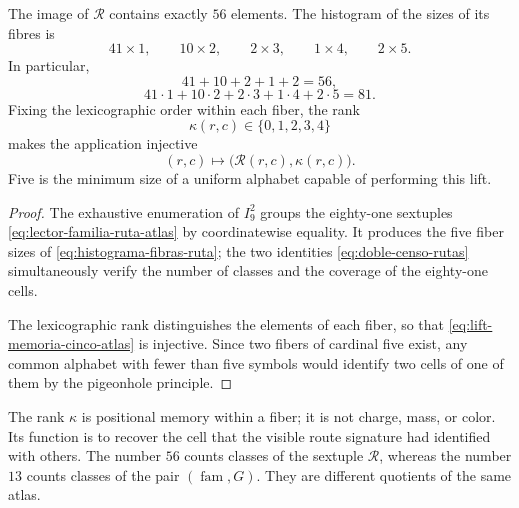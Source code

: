 \begin{theorem}
\label{thm:censo-56-familias-ruta-rev6}
The image of \(\mathcal R\) contains exactly \(56\) elements.  The
histogram of the sizes of its fibres is
\[
 41\times1,\qquad
 10\times2,\qquad
 2\times3,\qquad
 1\times4,\qquad
 2\times5.
 \tag{A7}\label{eq:histograma-fibras-ruta}
\]
In particular,
\[
 41+10+2+1+2=56,
\]
\[
 41\cdot1+10\cdot2+2\cdot3+1\cdot4+2\cdot5=81.
 \tag{A8}\label{eq:doble-censo-rutas}
\]
Fixing the lexicographic order within each fiber, the rank
\[
 \kappa(r,c)\in\{0,1,2,3,4\}
\]
makes the application injective
\[
 (r,c)\longmapsto\bigl(\mathcal R(r,c),\kappa(r,c)\bigr).
 \tag{A9}\label{eq:lift-memoria-cinco-atlas}
\]
Five is the minimum size of a uniform alphabet capable of performing this lift.
\end{theorem}

\begin{proof}
The exhaustive enumeration of \(I_9^2\) groups the eighty-one sextuples
\eqref{eq:lector-familia-ruta-atlas} by coordinatewise equality.
It produces the five fiber sizes of
\eqref{eq:histograma-fibras-ruta}; the two identities
\eqref{eq:doble-censo-rutas} simultaneously verify the number of classes
and the coverage of the eighty-one cells.

The lexicographic rank distinguishes the elements of each fiber, so that
\eqref{eq:lift-memoria-cinco-atlas} is injective.  Since two fibers
of cardinal five exist, any common alphabet with fewer than five symbols
would identify two cells of one of them by the pigeonhole principle.
\end{proof}

The rank \(\kappa\) is positional memory within a fiber; it is not
charge, mass, or color. Its function is to recover the cell that the visible
route signature had identified with others. The number \(56\) counts classes of the
sextuple \(\mathcal R\), whereas the number \(13\) counts classes of the pair
\((\operatorname{fam},G)\). They are different quotients of the same atlas.

